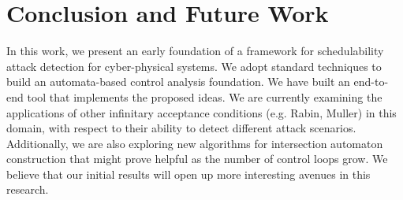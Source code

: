 \section{Conclusion and Future Work} \label{sec7}
\noindent
In this work, we present an early foundation of a framework for schedulability attack detection for cyber-physical systems. We adopt standard techniques to build an automata-based control analysis foundation. We have built an end-to-end tool that implements the proposed ideas.  We are currently examining the applications of other infinitary acceptance conditions (e.g. Rabin, Muller) in this domain, with respect to their ability to detect different attack scenarios. Additionally, we are also exploring new algorithms for intersection automaton construction that might prove helpful as the number of control loops grow. We believe that our initial results will open up more interesting avenues in this research.
